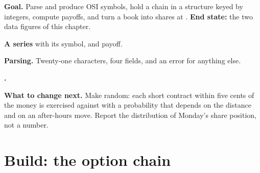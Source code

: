 \begin{tutorial}
\textbf{Goal.} Parse and produce OSI symbols, hold a chain in a structure
keyed by integers, compute payoffs, and turn a book into shares at .
\textbf{End state:} the two data figures of this chapter.
\begin{tutsteps}
\item \textbf{A series} with its symbol,  and payoff.
\label{lst:m1:option-contracts-and-exchanges:series}
\item \textbf{Parsing.} Twenty-one characters, four fields, and an error for
anything else.
\label{lst:m1:option-contracts-and-exchanges:parse}
\item \textbf{.}
\label{lst:m1:option-contracts-and-exchanges:expiry}
\end{tutsteps}
\textbf{What to change next.} Make  random: each short contract
within five cents of the money is exercised against with a probability that
depends on the distance and on an after-hours move. Report the distribution
of Monday's share position, not a number.
\end{tutorial}

\section{Build: the option chain}\label{bld:m1:option-contracts-and-exchanges:chain}

